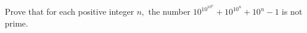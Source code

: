 Prove that for each positive integer $n,$ the number $10^{10^{10^n}}+10^{10^n}+10^n-1$ is not prime.